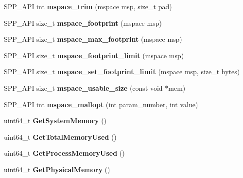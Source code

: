 \begin{DoxyCompactItemize}
\item 
S\+P\+P\+\_\+\+A\+PI int {\bfseries mspace\+\_\+trim} (mspace msp, size\+\_\+t pad)\hypertarget{namespacespp_a855d745753c6ea8aed27a95c77b0a875}{}\label{namespacespp_a855d745753c6ea8aed27a95c77b0a875}

\item 
S\+P\+P\+\_\+\+A\+PI size\+\_\+t {\bfseries mspace\+\_\+footprint} (mspace msp)\hypertarget{namespacespp_a084f00f1d62c6c88c275f272c23911a3}{}\label{namespacespp_a084f00f1d62c6c88c275f272c23911a3}

\item 
S\+P\+P\+\_\+\+A\+PI size\+\_\+t {\bfseries mspace\+\_\+max\+\_\+footprint} (mspace msp)\hypertarget{namespacespp_abb2a146727d1647b72a4c2322a3d7a8f}{}\label{namespacespp_abb2a146727d1647b72a4c2322a3d7a8f}

\item 
S\+P\+P\+\_\+\+A\+PI size\+\_\+t {\bfseries mspace\+\_\+footprint\+\_\+limit} (mspace msp)\hypertarget{namespacespp_ab4e1f5e991ecca7ba38a0d6448ef5af4}{}\label{namespacespp_ab4e1f5e991ecca7ba38a0d6448ef5af4}

\item 
S\+P\+P\+\_\+\+A\+PI size\+\_\+t {\bfseries mspace\+\_\+set\+\_\+footprint\+\_\+limit} (mspace msp, size\+\_\+t bytes)\hypertarget{namespacespp_a8ac0a259be6d5a8b93d3543d2b753e62}{}\label{namespacespp_a8ac0a259be6d5a8b93d3543d2b753e62}

\item 
S\+P\+P\+\_\+\+A\+PI size\+\_\+t {\bfseries mspace\+\_\+usable\+\_\+size} (const void $\ast$mem)\hypertarget{namespacespp_a8cac6ab1e4da86b8e63403b244c63cfb}{}\label{namespacespp_a8cac6ab1e4da86b8e63403b244c63cfb}

\item 
S\+P\+P\+\_\+\+A\+PI int {\bfseries mspace\+\_\+mallopt} (int param\+\_\+number, int value)\hypertarget{namespacespp_aba2c68a172ff13c31ff198ea8ead3bb6}{}\label{namespacespp_aba2c68a172ff13c31ff198ea8ead3bb6}

\item 
uint64\+\_\+t {\bfseries Get\+System\+Memory} ()\hypertarget{namespacespp_a916aaca9343371bbca38f88b39150046}{}\label{namespacespp_a916aaca9343371bbca38f88b39150046}

\item 
uint64\+\_\+t {\bfseries Get\+Total\+Memory\+Used} ()\hypertarget{namespacespp_a27b290a4224e0639d5f1dae97395ea63}{}\label{namespacespp_a27b290a4224e0639d5f1dae97395ea63}

\item 
uint64\+\_\+t {\bfseries Get\+Process\+Memory\+Used} ()\hypertarget{namespacespp_ab6475c51d862d6bc945df9c7aafa091f}{}\label{namespacespp_ab6475c51d862d6bc945df9c7aafa091f}

\item 
uint64\+\_\+t {\bfseries Get\+Physical\+Memory} ()\hypertarget{namespacespp_adfdda41377c454fad91bd1ea42c8f9c1}{}\label{namespacespp_adfdda41377c454fad91bd1ea42c8f9c1}

\end{DoxyCompactItemize}


